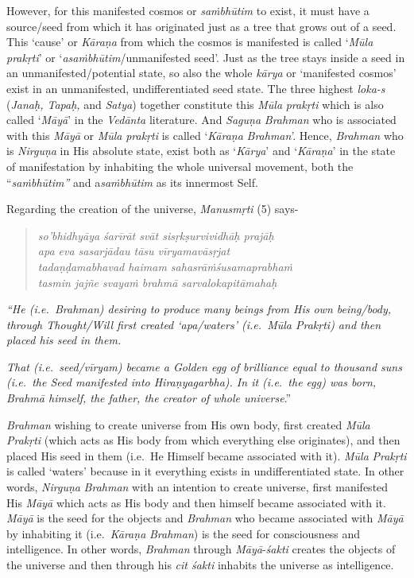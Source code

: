 However, for this manifested cosmos or \emph{saṁbhūtim} to exist, it must have a source/seed from which it has originated just as a tree that grows out of a seed. This `cause' or \emph{Kāraṇa} from which the cosmos is manifested is called `\emph{Mūla} \emph{prakṛti}' or `\emph{asaṁbhūtim}/unmanifested seed'. Just as the tree stays inside a seed in an unmanifested/potential state, so also the whole \emph{kārya} or `manifested cosmos' exist in an unmanifested, undifferentiated seed state. The three highest \emph{loka-s} (\emph{Janaḥ, Tapaḥ,} and \emph{Satya}) together constitute this \emph{Mūla} \emph{prakṛti} which is also called `\emph{Māyā}' in the \emph{Vedānta} literature. And \emph{Saguṇa} \emph{Brahman} who is associated with this \emph{Māyā} or \emph{Mūla} \emph{prakṛti} is called `\emph{Kāraṇa} \emph{Brahman}'. Hence, \emph{Brahman} who is \emph{Nirguṇa} in His absolute state, exist both as `\emph{Kārya}' and `\emph{Kāraṇa}' in the state of manifestation by inhabiting the whole universal movement, both the ``\emph{saṁbhūtim''} and a\emph{saṁbhūtim} as its innermost Self.

Regarding the creation of the universe, \emph{Manusmṛti} (5) says-

\begin{verse}
\emph{so'bhidhyāya śarīrāt svāt sisṛkṣurvividhāḥ prajāḥ }\\
\emph{apa eva sasarjādau tāsu vīryamavāsṛjat }\\
\emph{tadaṇḍamabhavad haimam sahasrāṁśusamaprabhaṁ~}\\
\emph{tasmin jajñe svayaṁ brahmā sarvalokapitāmahaḥ }
\end{verse}

\emph{``He (i.e.\ Brahman) desiring to produce many beings from His own being/body, through Thought/Will first created `apa/waters' (i.e.\ Mūla Prakṛti) and then placed his seed in them.}

\emph{That (i.e.\ seed/vīryam) became a Golden egg of brilliance equal to thousand suns (i.e.\ the Seed manifested into Hiraṇyagarbha). In it (i.e.\ the egg) was born, Brahmā himself, the father, the creator of whole universe}.''

\emph{Brahman} wishing to create universe from His own body, first created \emph{Mūla Prakṛti} (which acts as His body from which everything else originates), and then placed His seed in them (i.e.\ He Himself became associated with it). \emph{Mūla} \emph{Prakṛti} is called `waters' because in it everything exists in undifferentiated state. In other words, \emph{Nirguṇa} \emph{Brahman} with an intention to create universe, first manifested His \emph{Māyā} which acts as His body and then himself became associated with it. \emph{Māyā} is the seed for the objects and \emph{Brahman} who became associated with \emph{Māyā} by inhabiting it (i.e.\ \emph{Kāraṇa} \emph{Brahman}) is the seed for consciousness and intelligence. In other words, \emph{Brahman} through \emph{Māyā}-\emph{śakti} creates the objects of the universe and then through his \emph{cit śakti} inhabits the universe as intelligence.

